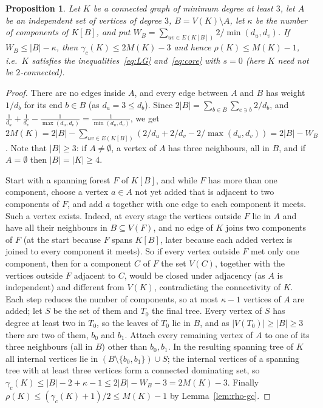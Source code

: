 \documentclass[11pt]{amsart}
\newtheorem{proposition}[theorem]{Proposition}
\theoremstyle{definition}
\begin{document}
\begin{proposition}\label{prop:hub}
Let $K$ be a connected graph of minimum degree at least $3$, let $A$ be an independent set of vertices of degree $3$,
$B=V(K)\setminus A$, let $\kappa$ be the number of components of $K[B]$, and put
$W_B=\sum_{uv\in E(K[B])}2/\min(d_u,d_v)$. If $W_B\le|B|-\kappa$, then $\gamma_c(K)\le2M(K)-3$ and hence
$\rho(K)\le M(K)-1$, i.e.\ $K$ satisfies the inequalities~\eqref{eq:LG} and~\eqref{eq:core} with $s=0$ (here $K$
need not be $2$-connected).
\end{proposition}

\begin{proof}
There are no edges inside $A$, and every edge between $A$ and $B$ has weight $1/d_b$ for its end $b\in B$ (as
$d_a=3\le d_b$). Since $2|B|=\sum_{b\in B}\sum_{e\ni b}2/d_b$, and $\frac1{d_u}+\frac1{d_v}-\frac1{\max(d_u,d_v)}
=\frac1{\min(d_u,d_v)}$, we get
$2M(K)=2|B|-\sum_{uv\in E(K[B])}(2/d_u+2/d_v-2/\max(d_u,d_v))=2|B|-W_B$. Note that $|B|\ge3$: if $A\ne\emptyset$,
a vertex of $A$ has three neighbours, all in $B$, and if $A=\emptyset$ then $|B|=|K|\ge4$.

Start with a spanning forest $F$ of $K[B]$, and while $F$ has more than one component, choose a vertex $a\in A$ not
yet added that is adjacent to two components of $F$, and add $a$ together with one edge to each component it meets.
Such a vertex exists. Indeed, at every stage the vertices outside $F$ lie in $A$ and have all their neighbours in
$B\subseteq V(F)$, and no edge of $K$ joins two components of $F$ (at the start because $F$ spans $K[B]$, later because
each added vertex is joined to every component it meets). So if every vertex outside $F$ met only one component, then
for a component $C$ of $F$ the set $V(C)$, together with the vertices outside $F$ adjacent to $C$, would be closed
under adjacency (as $A$ is independent) and different from $V(K)$, contradicting the connectivity of $K$. Each step
reduces the number of components, so at most $\kappa-1$ vertices of $A$ are added; let $S$ be the set of them and
$T_0$ the final tree. Every vertex of $S$ has degree at least two in $T_0$, so the leaves of $T_0$ lie in $B$, and as
$|V(T_0)|\ge|B|\ge3$ there are two of them, $b_0$ and $b_1$. Attach every remaining vertex of $A$ to one of its three
neighbours (all in $B$) other than $b_0,b_1$. In the resulting spanning tree of $K$ all internal vertices lie in
$(B\setminus\{b_0,b_1\})\cup S$; the internal vertices of a spanning tree with at least three vertices form a
connected dominating set, so $\gamma_c(K)\le|B|-2+\kappa-1\le2|B|-W_B-3=2M(K)-3$. Finally
$\rho(K)\le(\gamma_c(K)+1)/2\le M(K)-1$ by Lemma~\ref{lem:rho-gc}.
\end{proof}
\end{document}
